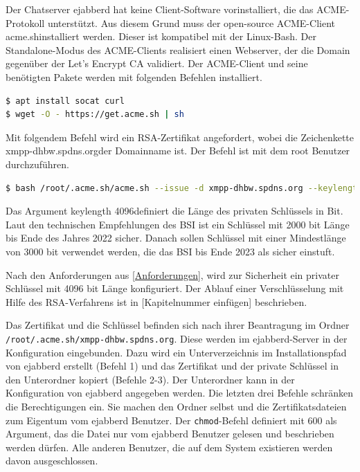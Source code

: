 \documentclass[a4paper,titlepage,halfparskip,12pt]{scrreprt}
\begin{document}
\begin{onehalfspacing}
Der Chatserver ejabberd hat keine Client-Software vorinstalliert, die das ACME-Protokoll unterstützt. Aus diesem Grund muss der open-source ACME-Client \glqq acme.sh\grqq installiert werden. Dieser ist kompatibel mit der Linux-Bash. Der Standalone-Modus des ACME-Clients realisiert einen Webserver, der die Domain gegenüber der Let's Encrypt \ac{CA} validiert.\cite{acmeshOfficial}
Der ACME-Client und seine benötigten Pakete werden mit folgenden Befehlen installiert.

\bigskip

\begin{lstlisting}[language=bash, caption={Installation der ACME-Client-Software für die Domainvalidierung}]
$ apt install socat curl
$ wget -O - https://get.acme.sh | sh
\end{lstlisting}

Mit folgendem Befehl wird ein \ac{RSA}-Zertifikat angefordert, wobei die Zeichenkette \glqq xmpp-dhbw.spdns.org\grqq der Domainname ist. Der Befehl ist mit dem root Benutzer durchzuführen.

\bigskip

\begin{lstlisting}[language=bash, caption={Installation des Let's Encrpt Zertifikats durch den ACME-Client}]
$ bash /root/.acme.sh/acme.sh --issue -d xmpp-dhbw.spdns.org --keylength 4096 --standalone
\end{lstlisting}

Das Argument \glqq keylength 4096\grqq definiert die Länge des privaten Schlüssels in Bit. Laut den technischen Empfehlungen des \ac{BSI} ist ein Schlüssel mit 2000 bit Länge bis Ende des Jahres 2022 sicher. Danach sollen Schlüssel mit einer Mindestlänge von 3000 bit verwendet werden, die das \ac{BSI} bis Ende 2023 als sicher einstuft.\cite{empfehlungBSI}

Nach den Anforderungen aus \autoref{Anforderungen}, wird zur Sicherheit ein privater Schlüssel mit 4096 bit Länge konfiguriert. Der Ablauf einer Verschlüsselung mit Hilfe des \ac{RSA}-Verfahrens ist in [Kapitelnummer einfügen] beschrieben.

Das Zertifikat und die Schlüssel befinden sich nach ihrer Beantragung im Ordner \texttt{/root/.acme.sh/xmpp-dhbw.spdns.org}. Diese werden im ejabberd-Server in der Konfiguration eingebunden. Dazu wird ein Unterverzeichnis im Installationspfad von ejabberd erstellt (Befehl 1) und das Zertifikat und der private Schlüssel in den Unterordner kopiert (Befehle 2-3). Der Unterordner kann in der Konfiguration von ejabberd angegeben werden.
Die letzten drei Befehle schränken die Berechtigungen ein. Sie machen den Ordner selbst und die Zertifikatsdateien zum Eigentum vom ejabberd Benutzer. Der \texttt{chmod}-Befehl definiert mit 600 als Argument, das die Datei nur vom ejabberd Benutzer gelesen und beschrieben werden dürfen. Alle anderen Benutzer, die auf dem System existieren werden davon ausgeschlossen.


\end{onehalfspacing}
\end{document}
